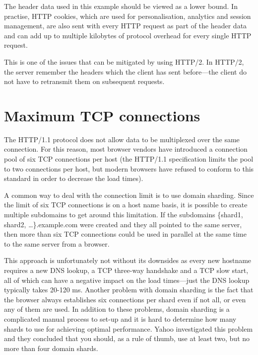\documentclass{cslthse-msc}
\begin{document}
The header data used in this example should be viewed as a lower bound. In practise, HTTP cookies, which are used for personalisation, analytics and session management, are also sent with every HTTP request as part of the header data and can add up to multiple kilobytes of protocol overhead for every single HTTP request\cite[page 200]{HPBN}.

This is one of the issues that can be mitigated by using HTTP/2. In HTTP/2, the server remember the headers which the client has sent before---the client do not have to retransmit them on subsequent requests\cite[page 222]{HPBN}.

\section{Maximum TCP connections}
\label{max_tcp}
The HTTP/1.1 protocol does not allow data to be multiplexed over the same connection\cite[p.194]{HPBN}. For this reason, most browser vendors have introduced a connection pool of six TCP connections per host (the HTTP/1.1 specification limits the pool to two connections\cite{rfc2616} per host, but modern browsers have refused to conform to this standard in order to decrease the load times).

A common way to deal with the connection limit is to use domain sharding. Since the limit of six TCP connections is on a host name basis, it is possible to create multiple subdomains to get around this limitation. If the subdomains \{shard1, shard2, \ldots\}.example.com were created and they all pointed to the same server, then more than six TCP connections could be used in parallel at the same time to the same server from a browser.

This approach is unfortunately not without its downsides as every new hostname requires a new DNS lookup, a TCP three-way handshake and a TCP slow start, all of which can have a negative impact on the load times\cite[page 199]{HPBN}---just the DNS lookup typically takes 20-120 ms\cite[page 63]{HPWS}. Another problem with domain sharding is the fact that the browser always establishes six connections per shard even if not all, or even any of them are used. In addition to these problems, domain sharding is a complicated manual process to set-up and it is hard to determine how many shards to use for achieving optimal performance. Yahoo investigated this problem and they concluded that you should, as a rule of thumb, use at least two, but no more than four domain shards\cite{yahoo-performance-4}.
\end{document}
